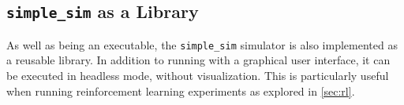 \subsection{\texttt{simple\_sim} as a Library}
As well as being an executable, the \texttt{simple\_sim} simulator is also implemented as a reusable library. In addition to running with a graphical user interface, it can be executed in headless mode, without visualization. This is particularly useful when running reinforcement learning experiments as explored in \cref{sec:rl}.
